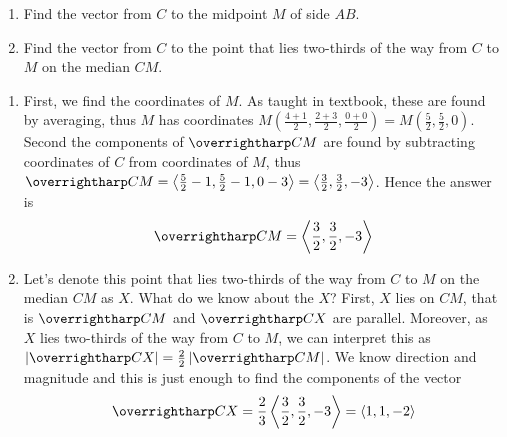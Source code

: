 \documentclass[8pt]{article} %
\begin{document}
\begin{description}
{{	\begin{enumerate}[label=\bfseries\alph*.]
		\item{Find the vector from $C$ to the midpoint $M$ of side $AB$.}
		\item{Find the vector from $C$ to the point that lies two-thirds of the way from $C$ to $M$ on the median $CM$.}
	\end{enumerate}}
	}
	\begin{enumerate}[label=\bfseries\alph*.]
		\newcommand{\myangled}[1]{\left<#1\right>}
		\item{First, we find the coordinates of $M$. As taught in textbook, these are found by averaging, thus $M$ has
			coordinates $M\left(\frac{4+1}{2},\frac{2+3}{2},\frac{0+0}{2}\right)=M\left(\frac{5}{2},\frac{5}{2},0\right)$.
			Second the components of $\myvec{CM}$ are found by subtracting coordinates of $C$ from coordinates of $M$,
			thus $\myvec{CM}=\left<\frac{5}{2}-1,\frac{5}{2}-1,0-3\right>=\myangled{\frac{3}{2},\frac{3}{2},-3}$. Hence the answer is
			\[\myvec{CM}=\myangled{\frac{3}{2},\frac{3}{2},-3}\]}
		\item{Let's denote this point that lies two-thirds of the way from $C$ to $M$ on the median $CM$ as $X$. What do we know about
			the $X$? First, $X$ lies on $CM$, that is $\myvec{CM}$ and $\myvec{CX}$ are parallel. Moreover, as $X$ 
			lies two-thirds of the way from $C$ to $M$, we can interpret this as $\myabs{\myvec{CX}}=\frac{2}{2}\myabs{\myvec{CM}}$.
			We know direction and magnitude and this is just enough to find the components of the vector
			\[\myvec{CX}=\frac{2}{3}\myangled{\frac{3}{2},\frac{3}{2},-3}=\myangled{1,1,-2}\]
			}
	\end{enumerate}
\end{description}
\end{document}

